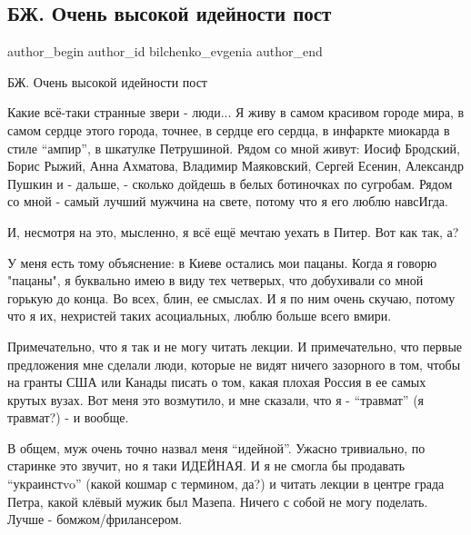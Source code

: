  
 
 
 
 
 
\subsection{БЖ. Очень высокой идейности пост}
\label{sec:14_12_2021.fb.bilchenko_evgenia.1.idejnost}
 
\ifcmt
 author_begin
   author_id bilchenko_evgenia
 author_end
\fi

БЖ. Очень высокой идейности пост

Какие всё-таки странные звери - люди... Я живу в самом красивом городе мира, в
самом сердце этого города, точнее, в сердце его сердца, в инфаркте миокарда в
стиле \enquote{ампир}, в шкатулке Петрушиной. Рядом со мной живут: Иосиф Бродский,
Борис Рыжий, Анна Ахматова, Владимир Маяковский, Сергей Есенин, Александр
Пушкин и - дальше, - сколько дойдешь в белых ботиночках по сугробам. Рядом со
мной - самый лучший мужчина на свете, потому что я его люблю навсИгда.


И, несмотря на это, мысленно, я всё ещё мечтаю уехать в Питер. Вот как так, а?

У меня есть тому объяснение: в Киеве остались мои пацаны. Когда я говорю
"пацаны", я буквально имею в виду тех четверых, что добухивали со мной горькую
до конца. Во всех, блин, ее смыслах. И я по ним очень скучаю, потому что я их,
нехристей таких асоциальных, люблю больше всего вмири.

Примечательно, что я так и не могу читать лекции. И примечательно, что первые
предложения мне сделали люди, которые не видят ничего зазорного в том, чтобы на
гранты США  или Канады писать о том, какая плохая Россия в ее самых крутых
вузах. Вот меня это возмутило, и мне сказали, что я - \enquote{травмат} (я травмат?) -
и вообще. 

В общем, муж очень точно назвал меня \enquote{идейной}. Ужасно тривиально, по старинке
это звучит, но я таки ИДЕЙНАЯ. И я не смогла бы продавать \enquote{украинстvo} (какой
кошмар с термином, да?) и читать лекции в центре града Петра, какой клёвый
мужик был Мазепа. Ничего с собой не могу поделать. Лучше - бомжом/фрилансером. 

